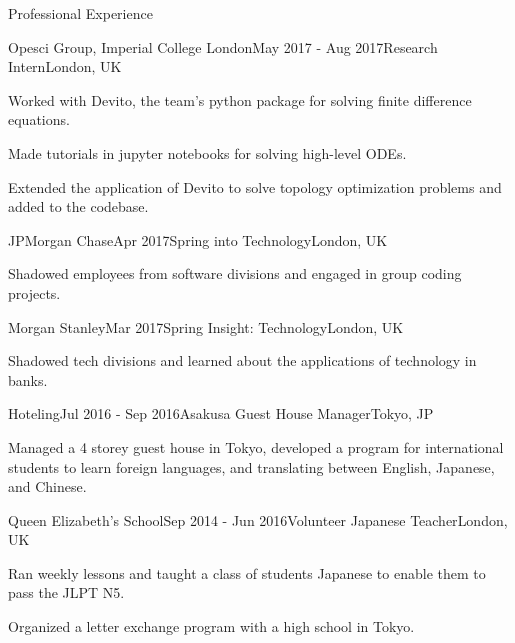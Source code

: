 \documentclass{resume} %
\begin{document}
\begin{rSection}{Professional Experience}

\begin{rSubsection}{Opesci Group, Imperial College London}{May 2017 - Aug 2017}{Research Intern}{London, UK}
    \item Worked with Devito, the team's python package for solving finite difference equations.
    \item Made tutorials in jupyter notebooks for solving high-level ODEs.
    \item Extended the application of Devito to solve topology optimization problems and added to the codebase.
\end{rSubsection}


\begin{rSubsection}{JPMorgan Chase}{Apr 2017}{Spring into Technology}{London, UK}
    \item Shadowed employees from software divisions and engaged in group coding projects.
\end{rSubsection}


\begin{rSubsection}{Morgan Stanley}{Mar 2017}{Spring Insight: Technology}{London, UK}
    \item Shadowed tech divisions and learned about the applications of technology in banks.
\end{rSubsection}


\begin{rSubsection}{Hoteling}{Jul 2016 - Sep 2016}{Asakusa Guest House Manager}{Tokyo, JP}
    \item Managed a 4 storey guest house in Tokyo, developed a program for international students to learn foreign languages, and translating between English, Japanese, and Chinese.
\end{rSubsection}


\begin{rSubsection}{Queen Elizabeth's School}{Sep 2014 - Jun 2016}{Volunteer Japanese Teacher}{London, UK}
    \item Ran weekly lessons and taught a class of students Japanese to enable them to pass the JLPT N5. 
    \item Organized a letter exchange program with a high school in Tokyo.
\end{rSubsection}


\end{rSection}
\end{document}
